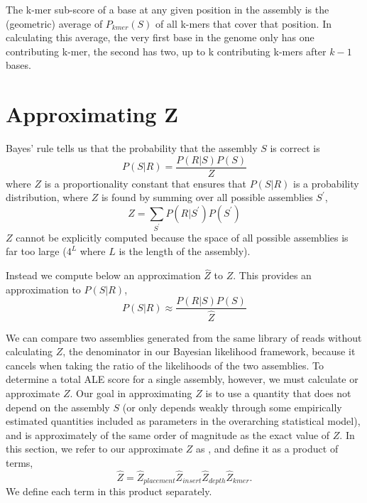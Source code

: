 \documentclass[phd,tocprelim]{cornell}
\begin{document}
The k-mer sub-score of a base at any given position in the assembly is the (geometric) average of $P_{kmer}(S)$ of all k-mers that cover that position. In calculating this average, the very first base in the genome only has one contributing k-mer, the second has two, up to k contributing k-mers after $k-1$ bases.



\section{Approximating Z} %
\label{sec:Approximating Z}

Bayes’ rule tells us that the probability that the assembly $S$ is correct is
\begin{equation}
    P(S|R) = \frac{P(R|S)P(S)}{Z}
\end{equation}
where $Z$ is a proportionality constant that ensures that $P(S|R)$ is a probability distribution, where $Z$ is found by summing over all possible assemblies $S^{\prime}$,
\begin{equation}
    Z = \sum_{S^{\prime}}P(R|S^{\prime})P(S^{\prime})
\end{equation}
$Z$ cannot be explicitly computed because the space of all possible assemblies is far too large ($4^{L}$ where $L$ is the length of the assembly). 

Instead we compute below an approximation $\hat{Z}$ to $Z$.  This provides an approximation to $P(S|R)$,
\begin{equation}
    P(S|R) \approx \frac{P(R|S)P(S)}{\hat{Z}}
\end{equation}

We can compare two assemblies generated from the same library of reads without calculating $Z$, the denominator in our Bayesian likelihood framework, because it cancels when taking the ratio of the likelihoods of the two assemblies. To determine a total ALE score for a single assembly, however, we must calculate or approximate $Z$. Our goal in approximating $Z$ is to use a quantity that does not depend on the assembly $S$ (or only depends weakly through some empirically estimated quantities included as parameters in the overarching statistical model), and is approximately of the same order of magnitude as the exact value of $Z$.  In this section, we refer to our approximate $Z$ as  , and define it as a product of terms,
\begin{equation}
    \hat{Z} = \hat{Z}_{placement}\hat{Z}_{insert}\hat{Z}_{depth}\hat{Z}_{kmer}.
\end{equation}
We define each term in this product separately.
\end{document}
